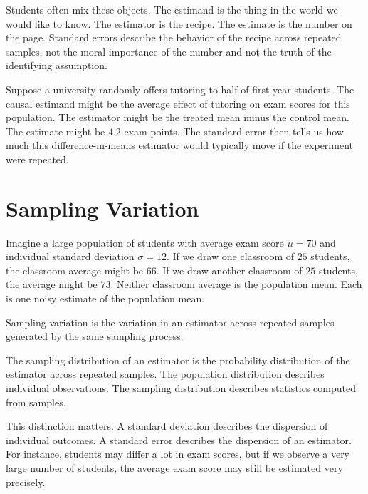 Students often mix these objects. The estimand is the thing in the world we
would like to know. The estimator is the recipe. The estimate is the number on
the page. Standard errors describe the behavior of the recipe across repeated
samples, not the moral importance of the number and not the truth of the
identifying assumption.

\begin{exmp}
Suppose a university randomly offers tutoring to half of first-year students.
The causal estimand might be the average effect of tutoring on exam scores for
this population. The estimator might be the treated mean minus the control
mean. The estimate might be $4.2$ exam points. The standard error then tells us
how much this difference-in-means estimator would typically move if the
experiment were repeated.
\end{exmp}

\section{Sampling Variation}

Imagine a large population of students with average exam score $\mu=70$ and
individual standard deviation $\sigma=12$. If we draw one classroom of $25$
students, the classroom average might be $66$. If we draw another classroom of
$25$ students, the average might be $73$. Neither classroom average is the
population mean. Each is one noisy estimate of the population mean.

\begin{defN}
Sampling variation is the variation in an estimator across repeated samples
generated by the same sampling process.
\end{defN}

\begin{defN}
The sampling distribution of an estimator is the probability distribution of
the estimator across repeated samples. The population distribution describes
individual observations. The sampling distribution describes statistics
computed from samples.
\end{defN}

This distinction matters. A standard deviation describes the dispersion of
individual outcomes. A standard error describes the dispersion of an estimator.
For instance, students may differ a lot in exam scores, but if we observe a
very large number of students, the average exam score may still be estimated
very precisely.

